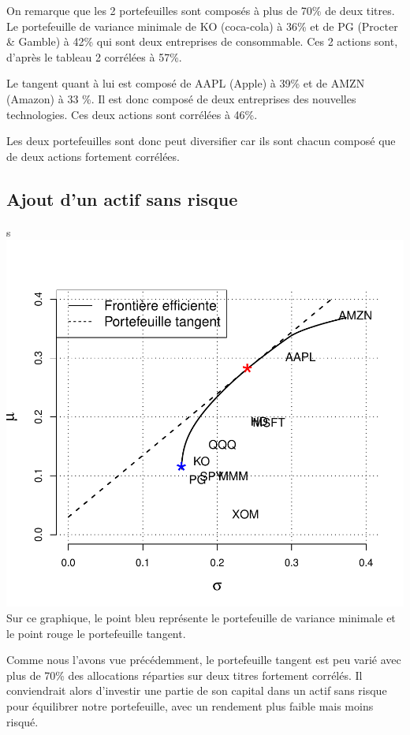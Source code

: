 \documentclass[
]{article}
\begin{document}
On remarque que les 2 portefeuilles sont composés à plus de 70\% de deux
titres. Le portefeuille de variance minimale de KO (coca-cola) à 36\% et
de PG (Procter \& Gamble) à 42\% qui sont deux entreprises de
consommable. Ces 2 actions sont, d'après le tableau 2 corrélées à 57\%.

Le tangent quant à lui est composé de AAPL (Apple) à 39\% et de AMZN
(Amazon) à 33 \%. Il est donc composé de deux entreprises des nouvelles
technologies. Ces deux actions sont corrélées à 46\%.

Les deux portefeuilles sont donc peut diversifier car ils sont chacun
composé que de deux actions fortement corrélées.

\hypertarget{ajout-dun-actif-sans-risque}{%
\subsection{Ajout d'un actif sans
risque}\label{ajout-dun-actif-sans-risque}}

s \includegraphics{TP-2_files/figure-latex/unnamed-chunk-11-1.pdf} Sur
ce graphique, le point bleu représente le portefeuille de variance
minimale et le point rouge le portefeuille tangent.

Comme nous l'avons vue précédemment, le portefeuille tangent est peu
varié avec plus de 70\% des allocations réparties sur deux titres
fortement corrélés. Il conviendrait alors d'investir une partie de son
capital dans un actif sans risque pour équilibrer notre portefeuille,
avec un rendement plus faible mais moins risqué.
\end{document}
